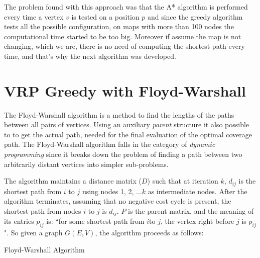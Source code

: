 The problem found with this approach was that the A* algorithm is performed every time a vertex $v$ is tested on a position $p$ and since the greedy algorithm tests all the possible configuration, on maps with more than 100 nodes the computational time started to be too big. Moreover if assume the map is not changing, which we are, there is no need of computing the shortest path every time, and that's why the next algorithm was developed.


\section{VRP Greedy with Floyd-Warshall}

The Floyd-Warshall algorithm is a method to find the lengths of the paths between all pairs of vertices. Using an auxiliary \textit{parent} structure it also possible to to get the actual path, needed for the final evaluation of the optimal coverage path. The Floyd-Warshall algorithm falls in the category of \textit{dynamic programming} since it breaks down the problem of finding a path between two arbitrarily distant vertices into simpler sub-problems.

The algorithm maintains a distance matrix ($D$) such that at iteration $k$, $d_{ij}$ is the shortest path from $i$ to $j$ using nodes 1, 2, ...$k$ as intermediate nodes. After the algorithm terminates, assuming that no negative cost cycle is present, the shortest path from nodes $i$ to $j$ is $d_{ij}$. $P$ is the parent matrix, and the meaning of its entries $p_{ij}$ is: ``for some shortest path from $i$to $j$, the vertex right before $j$ is $p_{ij}$". So given a graph $G(E,V)$, the algorithm proceeds as follows:

\begin{algorithm}[ht]
\begin{algorithmic}[1]

 \label{fw_initD}
 \label{fw_initP}
 \label{fw_initFor_i1}
   \label{fw_initFor_j1}
    \relax
    \ELSE
    \ENDIF
  \ENDFOR
\ENDFOR
{} \label{fw_initFor_i2}
       \label{fw_initFor_j2}
	   \label{fw_initFor_k2}
	    \ENDIF
	  \ENDFOR
      \ENDFOR
\ENDFOR
{} \label{a:return_D}
\end{algorithmic}
\caption{Floyd-Warshall Algorithm}\label{alg:floydWarsh}
\end{algorithm}

